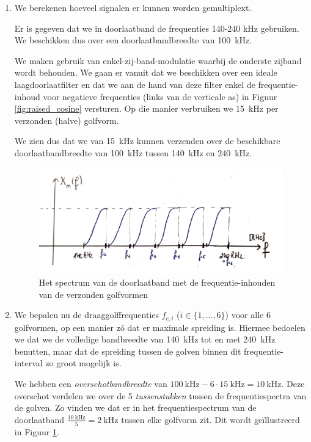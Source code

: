 \documentclass[kulak]{kulakarticle}
\begin{document}
\begin{enumerate}
		\item We berekenen hoeveel signalen er kunnen worden gemultiplext.

		Er is gegeven dat we in doorlaatband de frequenties 140-240 kHz gebruiken. We beschikken dus over een doorlaatbandbreedte van \SI{100}{\kilo\hertz}.

		We maken gebruik van enkel-zij-band-modulatie waarbij de onderste zijband wordt behouden. We gaan er vanuit dat we beschikken over een ideale laagdoorlaatfilter en dat we aan de hand van deze filter enkel de frequentie-inhoud voor negatieve frequenties (links van de verticale as) in Figuur \ref{fig:raised_cosine} versturen. Op die manier verbruiken we \SI{15}{\kilo\hertz} per verzonden (halve) golfvorm.

		We zien dus dat we  van \SI{15}{\kilo\hertz} kunnen verzenden over de beschikbare doorlaatbandbreedte van \SI{100}{\kilo\hertz} tussen \SI{140}{\kilo\hertz} en \SI{240}{\kilo\hertz}.

		\begin{figure}[h!]
			\centering
			\includegraphics[width=.8\textwidth]{doorlaatspectrum}
			\caption{Het spectrum van de doorlaatband met de frequentie-inhouden van de verzonden golfvormen}
			\label{fig:doorlaatspectrum}
		\end{figure}

		\item We bepalen nu de draaggolffrequenties \(f_{c,i}\) (\(i\in\{1,...,6\}\)) voor alle 6 golfvormen, op een manier zó dat er maximale spreiding is. Hiermee bedoelen we dat we de volledige bandbreedte van \SI{140}{\kilo\hertz} tot en met \SI{240}{\kilo\hertz} benutten, maar dat de spreiding tussen de golven binnen dit frequentie-interval zo groot mogelijk is.

		We hebben een \textit{overschotbandbreedte} van \(\SI{100}{\kilo\hertz} - 6 \cdot \SI{15}{\kilo\hertz} = \SI{10}{\kilo\hertz}\). Deze overschot verdelen we over de 5 \textit{tussenstukken} tussen de frequentiespectra van de golven. Zo vinden we dat er in het frequentiespectrum van de doorlaatband \(\frac{\SI{10}{\kilo\hertz}}{5} = \SI{2}{\kilo\hertz}\) tussen elke golfvorm zit. Dit wordt geïllustreerd in Figuur \ref{fig:doorlaatspectrum}.


\end{enumerate}
\end{document}
